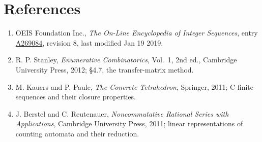 \documentclass[11pt]{article}
\theoremstyle{definition}
\begin{document}
\section{References}

\begin{enumerate}

\item OEIS Foundation Inc., \emph{The On-Line Encyclopedia of Integer Sequences}, entry \href{https://oeis.org/A269084}{A269084}, revision 8, last modified Jan 19 2019.

\item R. P. Stanley, \emph{Enumerative Combinatorics}, Vol.~1, 2nd ed., Cambridge University Press, 2012; \S4.7, the transfer-matrix method.

\item M. Kauers and P. Paule, \emph{The Concrete Tetrahedron}, Springer, 2011; C-finite sequences and their closure properties.

\item J. Berstel and C. Reutenauer, \emph{Noncommutative Rational Series with Applications}, Cambridge University Press, 2011; linear representations of counting automata and their reduction.

\end{enumerate}
\end{document}
